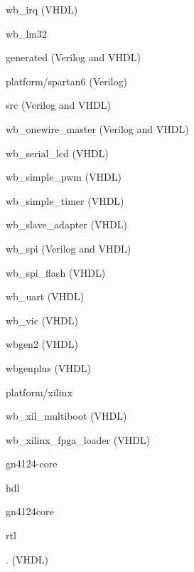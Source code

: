 \begin{dig}
\begin{dig}
\begin{dig}
\begin{dig}
\begin{dig}
                \item wb\_irq (VHDL)
                \item wb\_lm32
                    \begin{dig}
                    \item generated (Verilog and VHDL)
                    \item platform/spartan6 (Verilog)
                    \item src (Verilog and VHDL)
                    \end{dig}
                \item wb\_onewire\_master (Verilog and VHDL)
                \item wb\_serial\_lcd (VHDL)
                \item wb\_simple\_pwm (VHDL)
                \item wb\_simple\_timer (VHDL)
                \item wb\_slave\_adapter (VHDL)
                \item wb\_spi (Verilog and VHDL)
                \item wb\_spi\_flash (VHDL)
                \item wb\_uart (VHDL)
                \item wb\_vic (VHDL)
                \item wbgen2 (VHDL)
                \item wbgenplus (VHDL)
                \end{dig}
            \end{dig}
        \item platform/xilinx
            \begin{dig}
            \item wb\_xil\_multiboot (VHDL)
            \item wb\_xilinx\_fpga\_loader (VHDL)
            \end{dig}
        \end{dig}
    \item gn4124-core
        \begin{dig}
        \item hdl
        \begin{dig}
            \item gn4124core   
                \begin{dig}
                \item rtl
                    \begin{dig}
                    \item . (VHDL)

\end{dig}
\end{dig}
\end{dig}
\end{dig}
\end{dig}
\end{dig}
